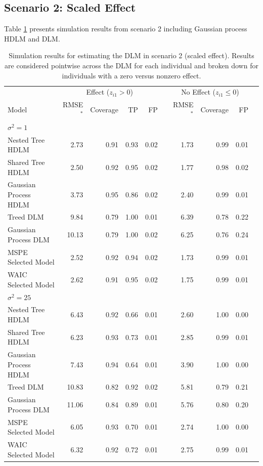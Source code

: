 \documentclass[12pt]{article}
\begin{document}
\subsection{Scenario 2: Scaled Effect}
Table \ref{tab:scen2_res} presents simulation results from scenario 2 including Gaussian process HDLM and DLM.

\begin{table}[!ht]
 \scriptsize
    \centering
    \caption{Simulation results for estimating the DLM in scenario 2 (scaled effect). Results are considered pointwise across the DLM for each individual and broken down for individuals with a zero versus nonzero effect.}\vspace{6pt}
    \label{tab:scen2_res}
    \begin{tabular}{lrrrrrrrrr}
        \toprule[2pt]
        &\multicolumn{4}{c}{Effect ($z_{i1}>0$)}&&\multicolumn{3}{c}{No Effect ($z_{i1}\leq0$)}\\
        \cmidrule(lr){2-5} \cmidrule(lr){7-9} 
        Model & RMSE$^*$ & Coverage & TP & FP & \phantom{a} &RMSE$^*$ & Coverage & FP \\
        \midrule
        \multicolumn{9}{l}{$\sigma^2=1$}\\
      Nested Tree HDLM & 2.73 & 0.91 & 0.93 & 0.02 &  & 1.73 & 0.99 & 0.01\\
      Shared Tree HDLM & 2.50 & 0.92 & 0.95 & 0.02 &  & 1.77 & 0.98 & 0.02 \\
 Gaussian Process HDLM & 3.73 & 0.95 & 0.86 & 0.02 &  & 2.40 & 0.99 & 0.01 \\
\addlinespace
             Treed DLM & 9.84 & 0.79 & 1.00 & 0.01 &  & 6.39 & 0.78 & 0.22 \\
               Gaussian Process DLM & 10.13 & 0.79 & 1.00 & 0.02 &  & 6.25 & 0.76 & 0.24 \\
\addlinespace
MSPE Selected Model & 2.52 & 0.92 & 0.94 & 0.02 &  & 1.73 & 0.99 & 0.01  \\
WAIC Selected Model & 2.62 & 0.91 & 0.95 & 0.02 &  & 1.75 & 0.99 & 0.01   \\
        \midrule
        
        
        \multicolumn{9}{l}{$\sigma^2=25$}\\
              Nested Tree HDLM & 6.43 & 0.92 & 0.66 & 0.01 &  & 2.60 & 1.00 & 0.00 \\
      Shared Tree HDLM & 6.23 & 0.93 & 0.73 & 0.01 &  & 2.85 & 0.99 & 0.01\\
 Gaussian Process HDLM & 7.43 & 0.94 & 0.64 & 0.01 &  & 3.90 & 1.00 & 0.00 \\
\addlinespace
            Treed DLM & 10.83 & 0.82 & 0.92 & 0.02 &  & 5.81 & 0.79 & 0.21 \\
               Gaussian Process DLM & 11.06 & 0.84 & 0.89 & 0.01 &  & 5.76 & 0.80 & 0.20 \\
\addlinespace
MSPE Selected Model & 6.05 & 0.93 & 0.70 & 0.01 &  & 2.74 & 1.00 & 0.00   \\
WAIC Selected Model & 6.32 & 0.92 & 0.72 & 0.01 &  & 2.75 & 0.99 & 0.01   \\
        

\end{tabular}
\end{table}
\end{document}

